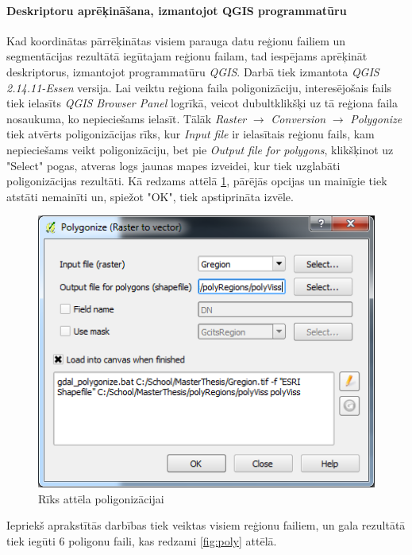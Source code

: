 \documentclass[12pt,paper=a4]{report}
\begin{document}
\paragraph{Deskriptoru aprēķināšana, izmantojot QGIS programmatūru}
Kad koordinātas pārrēķinātas visiem parauga datu reģionu failiem un segmentācijas rezultātā iegūtajam reģionu failam, tad iespējams aprēķināt deskriptorus, izmantojot programmatūru \textit{QGIS}. Darbā tiek izmantota \textit{QGIS 2.14.11-Essen} versija. Lai veiktu reģiona faila poligonizāciju, interesējošais fails tiek ielasīts \textit{QGIS} \textit{Browser Panel} logrīkā, veicot dubultklikšķi uz tā reģiona faila nosaukuma, ko nepieciešams ielasīt. Tālāk \textit{Raster} $\rightarrow$ \textit{Conversion} $\rightarrow$ \textit{Polygonize} tiek atvērts poligonizācijas rīks, kur \textit{Input file} ir ielasītais reģionu fails, kam nepieciešams veikt poligonizāciju, bet pie \textit{Output file for polygons}, klikšķinot uz "Select" pogas, atveras logs jaunas mapes izveidei, kur tiek uzglabāti poligonizācijas rezultāti. Kā redzams attēlā \ref{fig:poligonizacija}, pārējās opcijas un mainīgie tiek atstāti nemainīti un, spiežot "OK", tiek apstiprināta izvēle.
\begin{figure}[h!]
\centering
\includegraphics[scale=0.7]{polygonize} 
\caption{Rīks attēla poligonizācijai}
\label{fig:poligonizacija}
\end{figure}\par
Iepriekš aprakstītās darbības tiek veiktas visiem reģionu failiem, un gala rezultātā tiek iegūti 6 poligonu faili, kas redzami \ref{fig:poly} attēlā.
\end{document}
